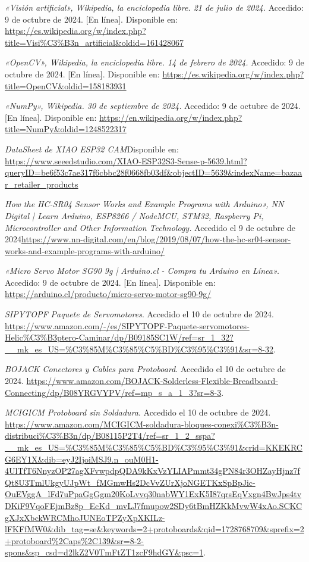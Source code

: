 \begin{thebibliography}{99}
    \textit{«Visión artificial», Wikipedia, la enciclopedia libre. 21 de julio de 2024.} Accedido: 9 de octubre de 2024. [En línea]. Disponible en: \url{https://es.wikipedia.org/w/index.php?title=Visi%C3%B3n_artificial&oldid=161428067}
    
    \textit{«OpenCV», Wikipedia, la enciclopedia libre. 14 de febrero de 2024.} Accedido: 9 de octubre de 2024. [En línea]. Disponible en: \url{https://es.wikipedia.org/w/index.php?title=OpenCV&oldid=158183931}
    
    \textit{«NumPy», Wikipedia. 30 de septiembre de 2024.} Accedido: 9 de octubre de 2024. [En línea]. Disponible en: \url{https://en.wikipedia.org/w/index.php?title=NumPy&oldid=1248522317}

    \textit{DataSheet de XIAO ESP32 CAM}Disponible en: \url{https://www.seeedstudio.com/XIAO-ESP32S3-Sense-p-5639.html?queryID=be6f53c7ae317f6cbbc28f0668fb03df&objectID=5639&indexName=bazaar_retailer_products}
            
    \textit{How the HC-SR04 Sensor Works and Example Programs with Arduino», NN Digital | Learn Arduino, ESP8266 / NodeMCU, STM32, Raspberry Pi, Microcontroller and Other Information Technology.} Accedido el 9 de octubre de 2024\url{https://www.nn-digital.com/en/blog/2019/08/07/how-the-hc-sr04-sensor-works-and-example-programs-with-arduino/}

    \textit{«Micro Servo Motor SG90 9g | Arduino.cl - Compra tu Arduino en Línea».} Accedido: 9 de octubre de 2024. [En línea]. Disponible en: \url{https://arduino.cl/producto/micro-servo-motor-sg90-9g/}

    \textit{SIPYTOPF Paquete de Servomotores}. Accedido el 10 de octubre de 2024. \url{https://www.amazon.com/-/es/SIPYTOPF-Paquete-servomotores-Helic%C3%B3ptero-Caminar/dp/B09185SC1W/ref=sr_1_32?__mk_es_US=%C3%85M%C3%85%C5%BD%C3%95%C3%91&sr=8-32}.

    \textit{BOJACK Conectores y Cables para Protoboard}. Accedido el 10 de octubre de 2024. \url{https://www.amazon.com/BOJACK-Solderless-Flexible-Breadboard-Connecting/dp/B08YRGVYPV/ref=mp_s_a_1_3?sr=8-3}.

    \textit{MCIGICM Protoboard sin Soldadura}. Accedido el 10 de octubre de 2024. \url{https://www.amazon.com/MCIGICM-soldadura-bloques-conexi%C3%B3n-distribuci%C3%B3n/dp/B08115P2T4/ref=sr_1_2_sspa?__mk_es_US=%C3%85M%C3%85%C5%BD%C3%95%C3%91&crid=KKEKRCG6EY1X&dib=eyJ2IjoiMSJ9.n_ouM0H1-4UlTfT6NnyzOP27agXFvwpdpQDA9kKxVzYLIAPmmt34gPN84r3OHZayHjnz7fQt8U3TmlUkgyUJpWt_fMGmwHs2DcVvZUrXjoNGETKxSpBpJic-OuEVggA_lFd7uPpaGgGgm20KoLvvq30nabWY1ExK5I87qrsEqVxgn4BwJps4tvDKiF9VqoFEjmBz8p_EcKd_mvLJ7fmupow2SDy6tBmHZKkMvwW4xAo.SCKCgXJxXbckWRCMhoJUNEoTPZyXpXKILz-lFKFfMW0&dib_tag=se&keywords=2+protoboards&qid=1728768709&sprefix=2+protoboard%2Caps%2C139&sr=8-2-spons&sp_csd=d2lkZ2V0TmFtZT1zcF9hdGY&psc=1}.


\end{thebibliography}
